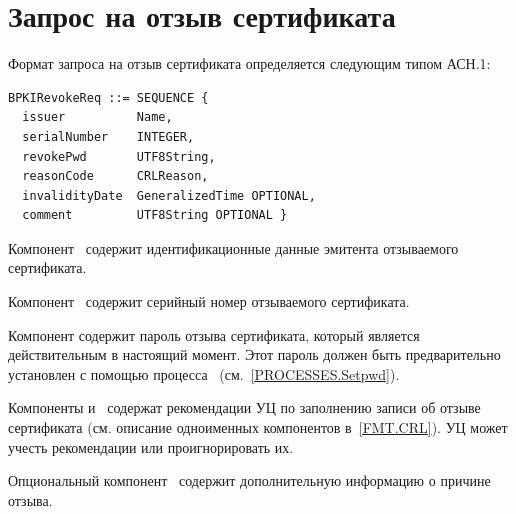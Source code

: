 ﻿\section{Запрос на отзыв сертификата}\label{FMT.BPKIRevokeReq}

Формат запроса на отзыв сертификата определяется следующим типом АСН.1:
\begin{verbatim}
BPKIRevokeReq ::= SEQUENCE {
  issuer          Name,
  serialNumber    INTEGER,
  revokePwd       UTF8String,
  reasonCode      CRLReason,      
  invalidityDate  GeneralizedTime OPTIONAL,
  comment         UTF8String OPTIONAL }
\end{verbatim}

Компонент~ содержит идентификационные данные эмитента 
отзываемого сертификата.

Компонент~ содержит серийный номер отзываемого 
сертификата.

Компонент  содержит пароль отзыва сертификата, который является
действительным в настоящий момент. Этот пароль должен быть предварительно
установлен с помощью процесса~ (см.~\ref{PROCESSES.Setpwd}).

Компоненты  и~
содержат рекомендации УЦ по заполнению записи об отзыве сертификата
(см. описание одноименных компонентов в~\ref{FMT.CRL}).
УЦ может учесть рекомендации или проигнорировать их.

Опциональный компонент~ содержит дополнительную информацию 
о причине отзыва.
 
